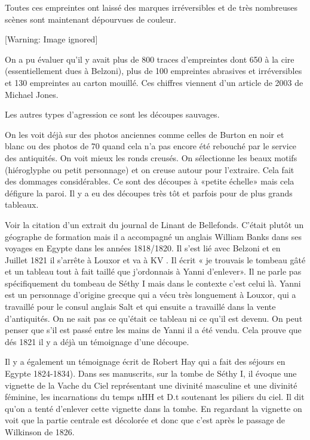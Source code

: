 \documentclass{article}
\begin{document}
Toutes ces empreintes ont laissé des marques irréversibles et de très
nombreuses scènes sont maintenant dépourvues de couleur.

  [Warning: Image ignored] %
 

On a pu évaluer qu’il y avait plus de 800 traces d’empreintes dont 650 à
la cire (essentiellement dues à Belzoni), plus de 100 empreintes
abrasives et irréversibles et 130 empreintes au carton mouillé. Ces
chiffres viennent d’un article de 2003 de Michael Jones.

Les autres types d’agression ce sont les découpes sauvages.  

On les voit déjà sur des photos anciennes comme celles de Burton en noir
et blanc ou des photos de 70 quand cela n’a pas encore été rebouché par
le service des antiquités. On voit mieux les ronds creusés. On
sélectionne les beaux motifs (hiéroglyphe ou petit personnage) et on
creuse autour pour l’extraire. Cela fait des dommages considérables. Ce
sont des découpes à «petite échelle» mais cela défigure la paroi. Il y
a eu des découpes très tôt et parfois pour de plus grands tableaux. 

Voir la citation d’un extrait du journal de Linant de Bellefonds.
C’était plutôt un géographe de formation mais il a accompagné un
anglais William Banks dans ses voyages en Egypte dans les années
1818/1820. Il s’est lié avec Belzoni et en Juillet 1821 il s’arrête à
Louxor et va à KV . Il écrit « je trouvais le tombeau gâté et un
tableau tout à fait taillé que j’ordonnais à Yanni d’enlever». Il ne
parle pas spécifiquement du tombeau de Séthy I mais dans le contexte
c’est celui là. Yanni est un personnage d’origine grecque qui a vécu
très longuement à Louxor, qui a travaillé pour le consul anglais Salt
et qui ensuite a travaillé dans la vente d’antiquités. On ne sait pas
ce qu’était ce tableau ni ce qu’il est devenu. On peut penser que s’il
est passé entre les mains de Yanni il a été vendu. Cela prouve que dés
1821 il y a déjà un témoignage d’une découpe. 

Il y a également un témoignage écrit de Robert Hay qui a fait des
séjours en Egypte 1824-1834). Dans ses manuscrits, sur la tombe de
Séthy I, il évoque une vignette de la Vache du Ciel représentant une
divinité  masculine et une divinité féminine, les incarnations du temps
nHH et D.t  soutenant les piliers du ciel. Il dit qu’on a tenté
d’enlever cette vignette dans la tombe. En regardant la vignette on
voit que la partie centrale est décolorée et donc que c’est après le
passage de Wilkinson de 1826. 
\end{document}
